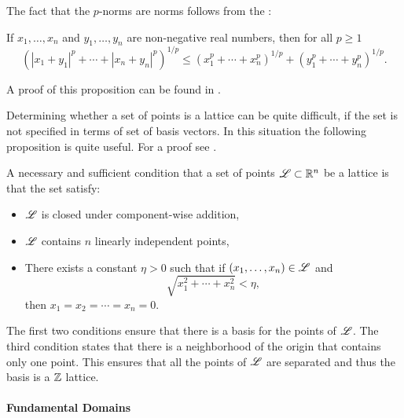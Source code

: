 The fact that the $p$-norms are norms follows from the  \cite[pages 115--117]{Minkowski96}:

\begin{proposition}[{\Minkowski}]
If $x_1, \ldots, x_n$ and $y_1, \ldots, y_n$ are non-nega\-tive real
numbers, then for all $p \ge 1$
\[
\left(|x_1 + y_1|^p + \cdots + |x_n + y_n|^p\right)^{1/p} \le 
\left(x_1^p + \cdots + x_n^p\right)^{1/p} + 
\left(y_1^p + \cdots + y_n^p\right)^{1/p}.
\]
\end{proposition}

\noindent
A proof of this proposition can be found in
\cite{Hardy:Inequalities}.

Determining whether a set of points is a lattice can be quite
difficult, if the set is not specified in terms of set of basis
vectors.  In this situation the following proposition is quite useful.
For a proof see {\Cassels} \cite[page 78]{Cassels:Geometry}.

\begin{proposition} \label{Lattice:Condition:Prop}
A necessary and sufficient condition that a set of points ${\cal L} \subset
\mathbb{R}^n$ be a lattice is that the set satisfy:
\begin{itemize}
\item ${\cal L}$ is closed under component-wise addition,
\item ${\cal L}$ contains $n$ linearly independent points,
\item There exists a constant $\eta> 0$ such that if $(x_1, \ldots,
x_n) \in {\cal L}$ and
\[
\sqrt{x_1^2 + \cdots + x_n^2} < \eta,
\]
then $x_1 = x_2 = \cdots = x_n = 0$.
\end{itemize}
\end{proposition}

The first two conditions ensure that there is a basis for the points
of ${\cal L}$.  The third condition states that there is a neighborhood of
the origin that contains only one point.  This ensures that all the
points of ${\cal L}$ are separated and thus the basis is a $\mathbb{Z}$ lattice.

\paragraph{Fundamental Domains}

